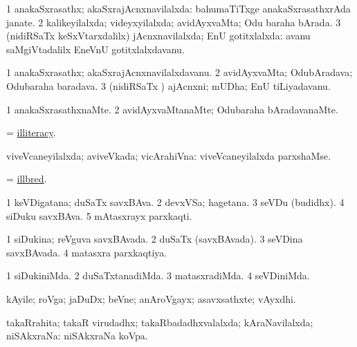 \bentry
{}
\gl{\gu}
\bmng
\bnum
\num{1} anakaSxrasathx; akaSxrajAcnxnavilalxda:  bahumaTiTxge anakaSxrasathxrAda janate. 
\num{2} kalikeyilalxda; videyxyilalxda; avidAyxvaMta; Odu baraha bArada. 
\num{3} (nidiRSaTx keSxVtarxdalilx) jAcnxnavilalxda; EnU gotitxlalxda:  avanu saMgiVtadalilx EneVnU gotitxlalxdavanu. 
\enum
\emng
\eentry

\bentry
{}
\gl{\nA}
\bmng
\bnum
\num{1} anakaSxrasathx; akaSxrajAcnxnavilalxdavanu. 
\num{2} avidAyxvaMta; OdubAradava; Odubaraha baradava. 
\num{3} (nidiRSaTx \vi) ajAcnxni; mUDha; EnU tiLiyadavanu. 
\enum
\emng
\eentry

\bentry
{}
\gl{\kirxvi}
\bmng
\bnum
\num{1} anakaSxrasathxnaMte. 
\num{2} avidAyxvaMtanaMte; Odubaraha bAradavanaMte. 
\enum
\emng
\eentry

\bentry
{}
\gl{\nA}
\bmng
 = \hyperlink{illiteracy}{illiteracy}. 
\emng
\eentry

\bentry
{}
\gl{\gu}
\bmng
viveVcaneyilalxda; aviveVkada; vicArahiVna:  viveVcaneyilalxda parxshaMse. 
\emng
\eentry

\bentry
{}
\gl{\gu}
\bmng
 = \hyperlink{ill-bred}{illbred}. 
\emng
\eentry

\bentry
{}
\gl{\nA}
\bmng
\bnum
\num{1} keVDigatana; duSaTx savxBAva. 
\num{2} devxVSa; hagetana. 
\num{3} seVDu (budidhx). 
\num{4} siDuku savxBAva. 
\num{5} mAtasxrayx parxkaqti. 
\enum
\emng
\eentry

\bentry
{}
\gl{\gu}
\bmng
\bnum
\num{1} siDukina; reVguva savxBAvada. 
\num{2} duSaTx (savxBAvada). 
\num{3} seVDina savxBAvada. 
\num{4} matasxra parxkaqtiya. 
\enum
\emng
\eentry

\bentry
{}
\gl{\kirxvi}
\bmng
\bnum
\num{1} siDukiniMda. 
\num{2} duSaTxtanadiMda. 
\num{3} matasxradiMda. 
\num{4} seVDiniMda. 
\enum
\emng
\eentry

\bentry
{}
\gl{\nA}
\bmng
kAyile; roVga; jaDuDx; beVne; anAroVgayx; asavxsathxte; vAyxdhi. 
\emng
\eentry

\bentry
{}
\gl{\gu}
\bmng
takaRrahita; takaR virudadhx; takaRbadadhxvalalxda; kAraNavilalxda; niSAkxraNa:  niSAkxraNa koVpa. 
\emng
\eentry

